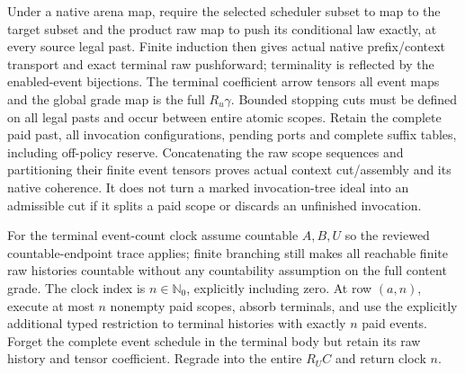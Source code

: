 \documentclass[11pt]{article}
\begin{document}
Under a native arena map, require the selected scheduler subset to map to the target subset and the product raw map to push its conditional law exactly, at every source legal past. Finite induction then gives actual native prefix/context transport and exact terminal raw pushforward; terminality is reflected by the enabled-event bijections. The terminal coefficient arrow tensors all event maps and the global grade map is the full $R_u\gamma$. Bounded stopping cuts must be defined on all legal pasts and occur between entire atomic scopes. Retain the complete paid past, all invocation configurations, pending ports and complete suffix tables, including off-policy reserve. Concatenating the raw scope sequences and partitioning their finite event tensors proves actual context cut/assembly and its native coherence. It does not turn a marked invocation-tree ideal into an admissible cut if it splits a paid scope or discards an unfinished invocation.

For the terminal event-count clock assume countable $A,B,U$ so the reviewed countable-endpoint trace applies; finite branching still makes all reachable finite raw histories countable without any countability assumption on the full content grade. The clock index is $n\in\mathbb N_0$, explicitly including zero. At row $(a,n)$, execute at most $n$ nonempty paid scopes, absorb terminals, and use the explicitly additional typed restriction to terminal histories with exactly $n$ paid events. Forget the complete event schedule in the terminal body but retain its raw history and tensor coefficient. Regrade into the entire $R_UC$ and return clock $n$.
\end{document}
